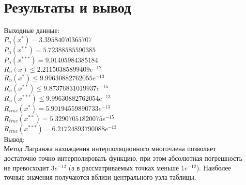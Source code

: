\documentclass[10pt]{scrartcl}
\begin{document}
\section*{Результаты и вывод}\noindent
Выходные данные:\\
$P_n(x^*) = 3.39584070365707$\\
$P_n(x^{**}) = 5.72388585590385$\\
$P_n(x^{***})= 9.01405984385184$\\
$R_n(x) \leq 2.21150385899409e^{-12}$\\
$R_n(x^*) \leq 9.99630882762055e^{-13}$\\
$R_n(x^{**}) \leq 9.87376831019937e^{-15}$\\
$R_n(x^{***}) \leq 9.99630882762054e^{-13}$\\
$R_{true}(x^*) = 5.90194559890733e^{-13}$\\
$R_{true}(x^{**}) = 5.32907051820075e^{-15}$\\
$R_{true}(x^{***}) = 6.21724893790088e^{-13}$\\
Вывод:\\
Метод Лагранжа нахождения интерполяционного многочлена позволяет достаточно точно интерполировать функцию, при этом абсолютная погрешность не превосходит $3 e^{-12}$ (а в рассматриваемых точках меньше
$1e^{-12}$). Наиболее точные значения получаются вблизи центрального узла таблицы.
\end{document}
